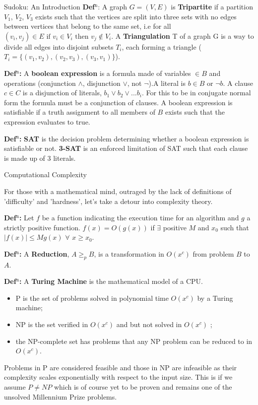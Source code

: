 \documentclass[final]{beamer}
\newlength{\colwidth}
\newcounter{col}
\begin{document}
\begin{frame}[t]
\begin{columns}[t]
\begin{column}{\colwidth}
\begin{exampleblock}{Sudoku: An Introduction}
\textbf{Def$^\text{n}$}: A graph $G=(V,E)$ is \textbf{Tripartite} if a partition $V_1$, $V_2$, $V_3$ exists such that the vertices are split into three sets with no edges between vertices that belong to the same set, i.e for all $(v_i,v_j) \in E\text{ if } v_i \in V_i\text{ then }v_j \not\in V_i $. A \textbf{Triangulation} T of a graph G is a way to divide all edges into disjoint subsets $T_i$, each forming a triangle ($T_i=\{(v_{1}, v_{2}),(v_{2}, v_{3}),(v_{3},v_{1})\}$).

\textbf{Def$^\text{n}$:} A \textbf{boolean expression} is a formula made of variables $\in B$ and operations (conjunction $\land$, disjunction $\lor$, not $\neg$).A literal is $b\in B$ or $\neg b$. A clause $c\in C$ is a disjunction of literals, $b_1 \lor b_2 \lor ... b_i$. For this to be in conjugate normal form the formula must be a conjunction of clauses. A boolean expression is satisfiable if a truth assignment to all members of $B$ exists such that the expression evaluates to true. 

\textbf{Def$^\text{n}$:}  \textbf{SAT} is the decision problem determining whether a boolean expression is satisfiable or not. \textbf{3-SAT} is an enforced limitation of SAT such that each clause is made up of 3 literals. 
  \end{exampleblock}
 \begin{block}{Computational Complexity}

For those with a mathematical mind, outraged by the lack of definitions of 'difficulty' and 'hardness', let's take a detour into complexity theory. 

\textbf{Def$^\text{n}$:} Let $f$ be a function indicating the execution time for an algorithm and $g$ a strictly positive function. $f(x)=O (g(x))$ if $\exists$ positive $ M$ and $x_0$ such that $|f(x)|\leq Mg(x)$ $\forall$ $x\geq x_0$.

\textbf{Def$^\text{n}$:} A \textbf{Reduction}, $A \geq_p B$, is a transformation in $O(x^c)$ from problem $B$ to $A$.

\textbf{Def$^\text{n}$:} A \textbf{Turing Machine} is the mathematical model of a CPU.

 \begin{itemize}
	\item{P is the set of problems solved in polynomial time $O(x^c)$ by a Turing machine;} 
	\item{NP is the set verified in $O(x^c)$ and but not solved in $O(x^c)$ ;} 
	\item{the NP-complete set has problems that any NP problem can be reduced to in $O(x^c)$.} 
\end{itemize}
Problems in P are considered feasible and those in NP are infeasible as their complexity scales exponentially with respect to the input size. This is if we assume $P\neq NP$ which is of course yet to be proven and remains one of the unsolved Millennium Prize problems. 


\end{block}
\end{column}
\end{columns}
\end{frame}
\end{document}
